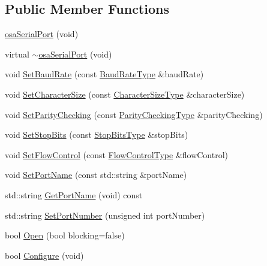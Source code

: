 \subsection*{Public Member Functions}
\begin{DoxyCompactItemize}
\item 
\hyperlink{classosa_serial_port_aec2efe7da1b46d934f2fe588defa16ed}{osa\-Serial\-Port} (void)
\item 
virtual \hyperlink{classosa_serial_port_a4e808949ec9d28e9e79fe81065b092be}{$\sim$osa\-Serial\-Port} (void)
\item 
void \hyperlink{classosa_serial_port_a36b6562b689bcf2239d250e3d63a9ee8}{Set\-Baud\-Rate} (const \hyperlink{classosa_serial_port_a3fd8e997892088f924754f9cc11c78a4}{Baud\-Rate\-Type} \&baud\-Rate)
\item 
void \hyperlink{classosa_serial_port_abeae13a35499433f635fc95521d5ac88}{Set\-Character\-Size} (const \hyperlink{classosa_serial_port_a9b6b558d8e4327ca921d9c010bec0462}{Character\-Size\-Type} \&character\-Size)
\item 
void \hyperlink{classosa_serial_port_a11750b56a0238acc1c758d142906d8d7}{Set\-Parity\-Checking} (const \hyperlink{classosa_serial_port_a5a7547284e891eed488992c6a7204bfa}{Parity\-Checking\-Type} \&parity\-Checking)
\item 
void \hyperlink{classosa_serial_port_ad882a5b66ba2f573539d064e46190dd0}{Set\-Stop\-Bits} (const \hyperlink{classosa_serial_port_aaa561ff95e10634b7ffa9ebf0ff164b5}{Stop\-Bits\-Type} \&stop\-Bits)
\item 
void \hyperlink{classosa_serial_port_af49c463657ff6669380f0f6428d9b91a}{Set\-Flow\-Control} (const \hyperlink{classosa_serial_port_a006138c4626520d3c2c1e5a78b279435}{Flow\-Control\-Type} \&flow\-Control)
\item 
void \hyperlink{classosa_serial_port_ab1c787036a143b1e2da9386a4be70948}{Set\-Port\-Name} (const std\-::string \&port\-Name)
\item 
std\-::string \hyperlink{classosa_serial_port_a946d8eaa779242690651a34ceacb33d7}{Get\-Port\-Name} (void) const 
\item 
std\-::string \hyperlink{classosa_serial_port_afba9a147f69981a5dbf70ffb558c725c}{Set\-Port\-Number} (unsigned int port\-Number)
\item 
bool \hyperlink{classosa_serial_port_ad0f93f7bb53646340f7fa7a485ba7a12}{Open} (bool blocking=false)
\item 
bool \hyperlink{classosa_serial_port_ab9052ac79c44c27f09abdde9b7c39aa5}{Configure} (void)

\end{DoxyCompactItemize}
